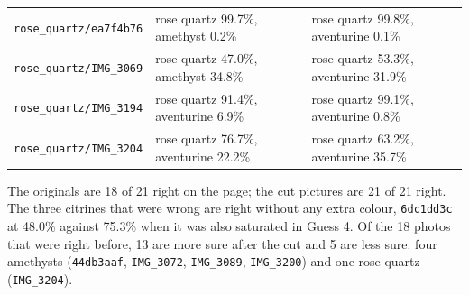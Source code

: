 \documentclass[11pt]{article}
\begin{document}
\begin{center}
\begin{tabular}{lll}
\texttt{rose\_quartz/ea7f4b76} & rose quartz 99.7\%, amethyst 0.2\% & rose quartz 99.8\%, aventurine 0.1\% \\
\texttt{rose\_quartz/IMG\_3069} & rose quartz 47.0\%, amethyst 34.8\% & rose quartz 53.3\%, aventurine 31.9\% \\
\texttt{rose\_quartz/IMG\_3194} & rose quartz 91.4\%, aventurine 6.9\% & rose quartz 99.1\%, aventurine 0.8\% \\
\texttt{rose\_quartz/IMG\_3204} & rose quartz 76.7\%, aventurine 22.2\% & rose quartz 63.2\%, aventurine 35.7\% \\
\bottomrule
\end{tabular}
\end{center}

The originals are 18 of 21 right on the page; the cut pictures are 21 of 21
right. The three citrines that were wrong are right without any extra colour,
\texttt{6dc1dd3c} at 48.0\% against 75.3\% when it was also saturated in Guess 4.
Of the 18 photos that were right before, 13 are more sure after the cut and 5
are less sure: four amethysts (\texttt{44db3aaf}, \texttt{IMG\_3072},
\texttt{IMG\_3089}, \texttt{IMG\_3200}) and one rose quartz (\texttt{IMG\_3204}).
\end{document}
